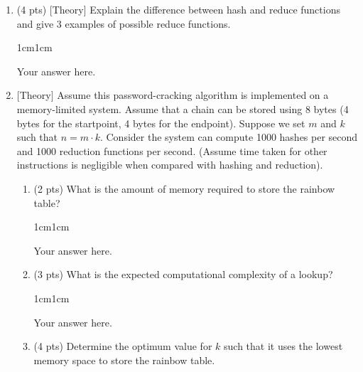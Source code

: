 \documentclass[11pt,letterpaper]{article}
\newenvironment{answer}{\em \color{blue} \begin{adjustwidth}{1cm}{1cm}}{\end{adjustwidth}}
\begin{document}
\begin{enumerate}
		\begin{answer}
			
			Your answer here.
			
		\end{answer}
		
		\item (4 pts) [Theory] Explain the difference between hash and reduce functions and give 3 examples of possible reduce functions.
		
		\begin{answer}
			
			Your answer here.
			
		\end{answer}
		
		\item $[$Theory$]$ Assume this password-cracking algorithm is implemented on a memory-limited system. Assume that a chain can be stored using 8 bytes (4 bytes for the startpoint, 4 bytes for the endpoint). Suppose we set $m$ and $k$ such that $n = m \cdot k$. Consider the system can compute 1000 hashes per second and 1000 reduction functions per second. (Assume time taken for other instructions is negligible when compared with hashing and reduction).
		
		\begin{enumerate}
			
			\item (2 pts) What is the amount of memory required to store the rainbow table?
			
			\begin{answer}
				
				Your answer here.
				
			\end{answer}
			
			\item (3 pts) What is the expected computational complexity of a lookup?
			
			\begin{answer}
				
				Your answer here.
				
			\end{answer}
			
			\item (4 pts) Determine the optimum value for $k$ such that it uses the lowest memory space to store the rainbow table.
			

\end{enumerate}
\end{enumerate}
\end{document}
